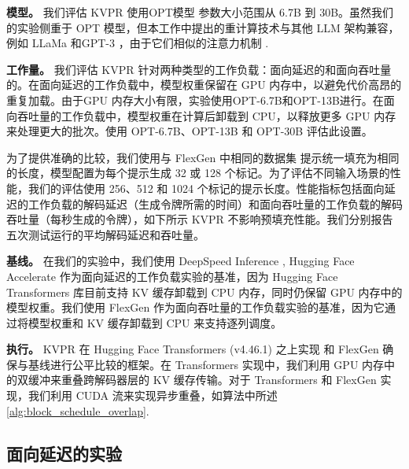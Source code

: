 \documentclass[11pt]{article}
\newcommand{\paperName}{KVPR}
\begin{document}
\noindent \textbf{模型。}
我们评估 {\paperName} 使用OPT模型 \cite{zhang2022opt} 参数大小范围从 6.7B 到 30B。虽然我们的实验侧重于 OPT 模型，但本工作中提出的重计算技术与其他 LLM 架构兼容，例如 LLaMa \cite{touvron2023llama} 和GPT-3 \cite{brown2020language}，由于它们相似的注意力机制 \cite{ashish2017attention}.

\noindent \textbf{工作量。}
我们评估 {\paperName} 针对两种类型的工作负载：面向延迟的和面向吞吐量的。在面向延迟的工作负载中，模型权重保留在 GPU 内存中，以避免代价高昂的重复加载。由于GPU 内存大小有限，实验使用OPT-6.7B和OPT-13B进行。在面向吞吐量的工作负载中，模型权重在计算后卸载到 CPU，以释放更多 GPU 内存来处理更大的批次。使用 OPT-6.7B、OPT-13B 和 OPT-30B 评估此设置。

为了提供准确的比较，我们使用与 FlexGen 中相同的数据集 \cite{sheng2023flexgen} 提示统一填充为相同的长度，模型配置为每个提示生成 32 或 128 个标记。为了评估不同输入场景的性能，我们的评估使用 256、512 和 1024 个标记的提示长度。性能指标包括面向延迟的工作负载的解码延迟（生成令牌所需的时间）和面向吞吐量的工作负载的解码吞吐量（每秒生成的令牌），如下所示 {\paperName} 不影响预填充性能。我们分别报告五次测试运行的平均解码延迟和吞吐量。

\noindent \textbf{基线。}
在我们的实验中，我们使用 DeepSpeed Inference \cite{aminabadi2022deepspeed}, Hugging Face Accelerate \cite{accelerate} 作为面向延迟的工作负载实验的基准，因为 Hugging Face Transformers 库目前支持 KV 缓存卸载到 CPU 内存，同时仍保留 GPU 内存中的模型权重。我们使用 FlexGen \cite{sheng2023flexgen} 作为面向吞吐量的工作负载实验的基准，因为它通过将模型权重和 KV 缓存卸载到 CPU 来支持逐列调度。

\noindent \textbf{执行。} {\paperName} 在 Hugging Face Transformers (v4.46.1) 之上实现 \cite{wolf2020transformers} 和 FlexGen \cite{sheng2023flexgen} 确保与基线进行公平比较的框架。在 Transformers 实现中，我们利用 GPU 内存中的双缓冲来重叠跨解码器层的 KV 缓存传输。对于 Transformers 和 FlexGen 实现，我们利用 CUDA 流来实现异步重叠，如算法中所述 \ref{alg:block_schedule_overlap}.

\subsection{面向延迟的实验}
\end{document}
